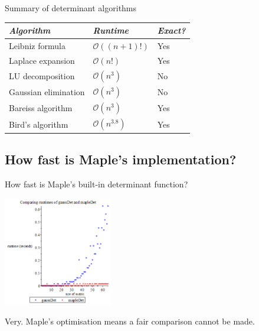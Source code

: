 \documentclass[handout]{beamer}
\begin{document}
\begin{frame}{Summary of determinant algorithms}

    \begin{center}
        \begin{tabular}{l l l}
            \toprule
            \emph{Algorithm}     & \emph{Runtime}           & \emph{Exact?} \\
            \midrule
            Leibniz formula      & $\mathcal{O}((n+1)!)$    & Yes \\
            Laplace expansion    & $\mathcal{O}(n!)$        & Yes \\
            LU decomposition     & $\mathcal{O}(n^3)$       & No \\
            Gaussian elimination & $\mathcal{O}(n^3)$       & No \\
            Bareiss algorithm    & $\mathcal{O}(n^3)$       & Yes \\
            Bird's algorithm     & $\mathcal{O}(n^{3.8})$   & Yes \\
            \bottomrule
        \end{tabular}
    \end{center}

\end{frame}

\subsection{How fast is Maple's implementation?}

\begin{frame}{How fast is Maple's built-in determinant function?}

    \begin{center}{}
        \includegraphics[height=180]{gauss-maple}
    \end{center}

    Very. Maple's optimisation means a fair comparison cannot be made.

\end{frame}
\end{document}
